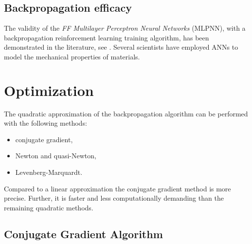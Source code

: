 \subsection{Backpropagation efficacy}
\label{subsec:backpropagationefficacy}

The validity of the \textit{\acs{FF} Multilayer Perceptron Neural Networks}
(\acs{MLPNN}), with a backpropagation reinforcement learning training algorithm,
has been demonstrated in the 
literature, see \citet{RefWorks:158}. Several scientists 
\cite{RefWorks:161, RefWorks:166, RefWorks:167, RefWorks:168, RefWorks:169,
RefWorks:170, RefWorks:178, RefWorks:179} have employed \acs{ANNs} to model
the mechanical properties of materials.

\section{Optimization}
\label{sec:optimization}

The quadratic approximation of the backpropagation algorithm can be performed
with the following methods:

\begin{itemize}
  \item{conjugate gradient,}
  \item{Newton and quasi-Newton,}
  \item{Levenberg-Marquardt.}
\end{itemize}

Compared to a linear approximation the conjugate gradient method is 
more precise. 
Further, it is faster and less computationally demanding than the
remaining quadratic methods.

\subsection{Conjugate Gradient Algorithm}
\label{subsec:conjugategradientalgorithm}

